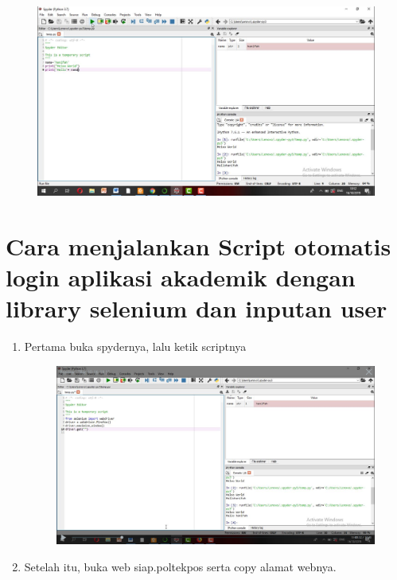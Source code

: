 \begin{enumerate}
\begin{enumerate}
\begin{enumerate}
\begin{enumerate}
\begin{enumerate}
\begin{enumerate}
\begin{figure}[h]
    \includegraphics[scale=0.2]{gambar/34.png}
    \caption{}
    \label{fig:my_label}
\end{figure}
\section*{ Cara menjalankan Script otomatis login aplikasi akademik dengan library selenium dan inputan user}
\begin{enumerate}
\item  Pertama buka spydernya, lalu ketik scriptnya
\begin{figure}[h]
    \centering
    \includegraphics[scale=0.2]{gambar/36.png}
    \caption{}
    \label{fig:my_label}
\end{figure}
\item  Setelah itu, buka web siap.poltekpos serta copy alamat webnya.
\begin{figure}[h]
    \centering

\end{figure}
\end{enumerate}
\end{enumerate}
\end{enumerate}
\end{enumerate}
\end{enumerate}
\end{enumerate}
\end{enumerate}
